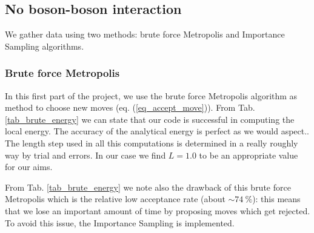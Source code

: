 
\subsection{No boson-boson interaction}
We gather data using two methods: brute force Metropolis and Importance Sampling algorithms. 

\subsubsection{Brute force Metropolis}
In this first part of the project, we use the brute force Metropolis algorithm as method to choose new moves (eq. (\ref{eq_accept_move})). From Tab. \ref{tab_brute_energy} we can state that our code is successful in computing the local energy. The accuracy of the analytical energy is perfect as we would aspect.. The length step used in all this computations is determined in a really roughly way by trial and errors. In our case we find $L=1.0$ to be an appropriate value for our aims. 

From Tab. \ref{tab_brute_energy} we note also the drawback of this brute force Metropolis which is the relative low acceptance rate (about $\sim 74\ \si{\percent}$): this means that we lose an important amount of time by proposing moves which get rejected. To avoid this issue, the Importance Sampling is implemented.


